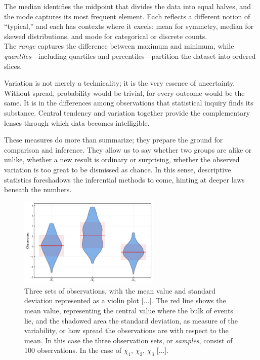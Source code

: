 \documentclass{book}
\begin{document}
The median identifies the midpoint that divides the data into equal halves, and the mode captures its most frequent element. Each reflects a different notion of “typical,” and each has contexts where it excels: mean for symmetry, median for skewed distributions, and mode for categorical or discrete counts.\\

The \textit{range} captures the difference between maximum and minimum, while \textit{quantiles}—including quartiles and percentiles—partition the dataset into ordered slices.

\medskip

Variation is not merely a technicality; it is the very essence of uncertainty. Without spread, probability would be trivial, for every outcome would be the same. It is in the differences among observations that statistical inquiry finds its substance. Central tendency and variation together provide the complementary lenses through which data becomes intelligible.

\medskip

These measures do more than summarize; they prepare the ground for comparison and inference. They allow us to say whether two groups are alike or unlike, whether a new result is ordinary or surprising, whether the observed variation is too great to be dismissed as chance. In this sense, descriptive statistics foreshadows the inferential methods to come, hinting at deeper laws beneath the numbers.

\begin{figure}[ht]
    \centering
    \includegraphics[width=0.6\textwidth]{figures/chapter1/mean_std_violin.png}
    \caption{Three sets of observations, with the mean value and standard deviation represented as a violin plot [...]. The red line shows the mean value, representing the central value where the bulk of events lie, and the shadowed area the standard deviation, as measure of the variability, or how spread the observations are with respect to the mean. In this case the three observation sets, or \textit{samples}, consist of 100 observations. In the case of $\chi_1$, $\chi_2$, $\chi_3$ [...].}
    \label{fig:histogram1}
\end{figure}
\end{document}

